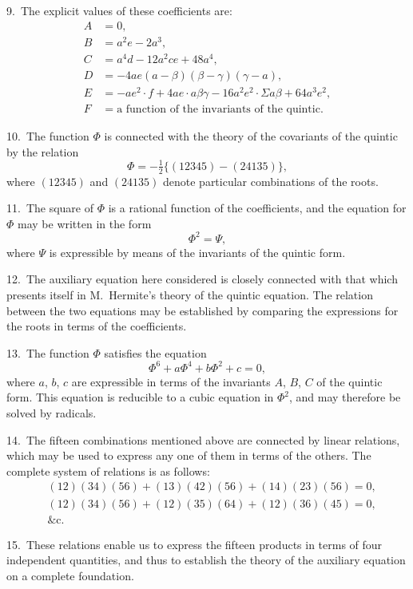 \documentclass[11pt,a4paper]{book}
\begin{document}
9.\ The explicit values of these coefficients are:
\begin{align*}
A &= 0,\\
B &= a^2e - 2a^3,\\
C &= a^4d - 12a^2ce + 48a^4,\\
D &= -4ae(a-\beta)(\beta-\gamma)(\gamma-a),\\
E &= -ae^2\cdot f + 4ae\cdot a\beta\gamma - 16a^2e^2\cdot\Sigma a\beta + 64a^3e^2,\\
F &= \text{a function of the invariants of the quintic}.
\end{align*}

\newpage
\setcounter{page}{325}

10.\ The function $\Phi$ is connected with the theory of the covariants of the quintic by the relation
\[
\Phi = -\tfrac{1}{2}\{(12345)-(24135)\},
\]
where $(12345)$ and $(24135)$ denote particular combinations of the roots.

11.\ The square of $\Phi$ is a rational function of the coefficients, and the equation for $\Phi$ may be written in the form
\[
\Phi^2 = \Psi,
\]
where $\Psi$ is expressible by means of the invariants of the quintic form.

\newpage
\setcounter{page}{326}

12.\ The auxiliary equation here considered is closely connected with that which presents itself in M.~Hermite's theory of the quintic equation. The relation between the two equations may be established by comparing the expressions for the roots in terms of the coefficients.

13.\ The function $\Phi$ satisfies the equation
\[
\Phi^6 + a\Phi^4 + b\Phi^2 + c = 0,
\]
where $a$, $b$, $c$ are expressible in terms of the invariants $A$, $B$, $C$ of the quintic form. This equation is reducible to a cubic equation in $\Phi^2$, and may therefore be solved by radicals.

\newpage
\setcounter{page}{327}

14.\ The fifteen combinations mentioned above are connected by linear relations, which may be used to express any one of them in terms of the others. The complete system of relations is as follows:
\begin{align*}
&(12)(34)(56) + (13)(42)(56) + (14)(23)(56) = 0,\\
&(12)(34)(56) + (12)(35)(64) + (12)(36)(45) = 0,\\
&\text{\&c.}
\end{align*}

15.\ These relations enable us to express the fifteen products in terms of four independent quantities, and thus to establish the theory of the auxiliary equation on a complete foundation.
\end{document}
